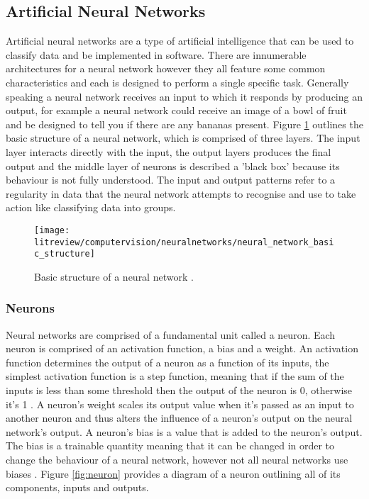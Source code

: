 \subsection{Artificial Neural Networks}

Artificial neural networks are a type of artificial intelligence that can be used to classify data and be implemented in software. There are innumerable architectures for a neural network however they all feature some common characteristics and each is designed to perform a single specific task. Generally speaking a neural network receives an input to which it responds by producing an output, for example a neural network could receive an image of a bowl of fruit and be designed to tell you if there are any bananas present. Figure \ref{fig:neural_network} outlines the basic structure of a neural network, which is comprised of three layers. The input layer interacts directly with the input, the output layers produces the final output and the middle layer of neurons is described a 'black box' because its behaviour is not fully understood. The input and output patterns refer to a regularity in data that the neural network attempts to recognise and use to take action like classifying data into groups\cite{statistical_pattern_recognition}. 


\begin{figure}[ht]
    \centering
    \texttt{[image: litreview/computervision/neuralnetworks/neural\_network\_basic\_structure]}
    \caption{Basic structure of a neural network \cite{neural_networks}.}
    \label{fig:neural_network}
\end{figure}

\subsubsection{Neurons}

Neural networks are comprised of a fundamental unit called a neuron. Each neuron is comprised of an activation function, a bias and a weight. An activation function determines the output of a neuron as a function of its inputs, the simplest activation function is a step function, meaning that if the sum of the inputs is less than some threshold then the output of the neuron is 0, otherwise it's 1 \cite{machine_learning_dictionary}. A neuron's weight scales its output value when it's passed as an input to another neuron and thus alters the influence of a neuron's output on the neural network's output. A neuron's bias is a value that is added to the neuron's output. The bias is a trainable quantity meaning that it can be changed in order to change the behaviour of a neural network, however not all neural networks use biases \cite{neural_networks}. Figure \ref{fig:neuron} provides a diagram of a neuron outlining all of its components, inputs and outputs. 


